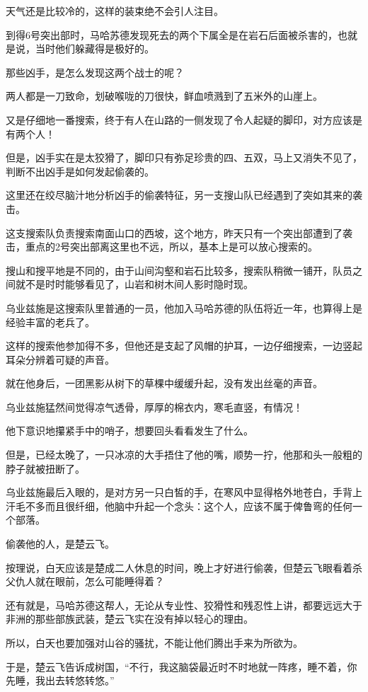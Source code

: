 天气还是比较冷的，这样的装束绝不会引人注目。

到得6号突出部时，马哈苏德发现死去的两个下属全是在岩石后面被杀害的，也就是说，当时他们躲藏得是极好的。

那些凶手，是怎么发现这两个战士的呢？

两人都是一刀致命，划破喉咙的刀很快，鲜血喷溅到了五米外的山崖上。

又是仔细地一番搜索，终于有人在山路的一侧发现了令人起疑的脚印，对方应该是有两个人！

但是，凶手实在是太狡猾了，脚印只有弥足珍贵的四、五双，马上又消失不见了，判断不出凶手是如何发起偷袭的。

这里还在绞尽脑汁地分析凶手的偷袭特征，另一支搜山队已经遇到了突如其来的袭击。

这支搜索队负责搜索南面山口的西坡，这个地方，昨天只有一个突出部遭到了袭击，重点的2号突出部离这里也不远，所以，基本上是可以放心搜索的。

搜山和搜平地是不同的，由于山间沟壑和岩石比较多，搜索队稍微一铺开，队员之间就不是时时能够看见了，山岩和树木间人影时隐时现。

乌业兹施是这搜索队里普通的一员，他加入马哈苏德的队伍将近一年，也算得上是经验丰富的老兵了。

这样的搜索他参加得不多，但他还是支起了风帽的护耳，一边仔细搜索，一边竖起耳朵分辨着可疑的声音。

就在他身后，一团黑影从树下的草棵中缓缓升起，没有发出丝毫的声音。

乌业兹施猛然间觉得凉气透骨，厚厚的棉衣内，寒毛直竖，有情况！

他下意识地攥紧手中的哨子，想要回头看看发生了什么。

但是，已经太晚了，一只冰凉的大手捂住了他的嘴，顺势一拧，他那和头一般粗的脖子就被扭断了。

乌业兹施最后入眼的，是对方另一只白皙的手，在寒风中显得格外地苍白，手背上汗毛不多而且很纤细，他脑中升起一个念头：这个人，应该不属于俾鲁弯的任何一个部落。

偷袭他的人，是楚云飞。

按理说，白天应该是楚成二人休息的时间，晚上才好进行偷袭，但楚云飞眼看着杀父仇人就在眼前，怎么可能睡得着？

还有就是，马哈苏德这帮人，无论从专业性、狡猾性和残忍性上讲，都要远远大于非洲的那些部族武装，楚云飞实在没有掉以轻心的理由。

所以，白天也要加强对山谷的骚扰，不能让他们腾出手来为所欲为。

于是，楚云飞告诉成树国，“不行，我这脑袋最近时不时地就一阵疼，睡不着，你先睡，我出去转悠转悠。”

